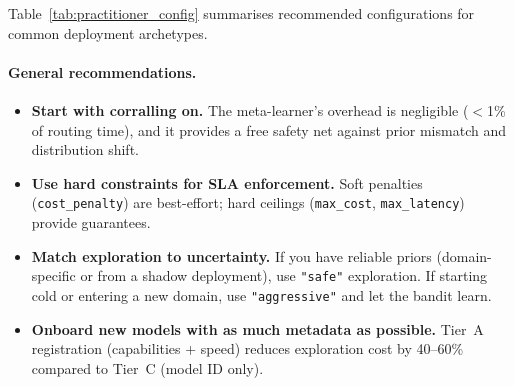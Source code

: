 Table~\ref{tab:practitioner_config} summarises recommended configurations for common deployment archetypes.

\begin{table}[htbp]
\centering
\caption{Recommended banditGPT configurations by deployment archetype.}
\label{tab:practitioner_config}
\small
{}
\end{table}

\paragraph{General recommendations.}

\begin{itemize}[nosep,leftmargin=*]
    \item \textbf{Start with corralling on.} The meta-learner's overhead is negligible ($<$1\% of routing time), and it provides a free safety net against prior mismatch and distribution shift.
    \item \textbf{Use hard constraints for SLA enforcement.} Soft penalties (\texttt{cost\_penalty}) are best-effort; hard ceilings (\texttt{max\_cost}, \texttt{max\_latency}) provide guarantees.
    \item \textbf{Match exploration to uncertainty.} If you have reliable priors (domain-specific or from a shadow deployment), use \texttt{"safe"} exploration.  If starting cold or entering a new domain, use \texttt{"aggressive"} and let the bandit learn.
    \item \textbf{Onboard new models with as much metadata as possible.} Tier~A registration (capabilities + speed) reduces exploration cost by 40--60\% compared to Tier~C (model ID only).
\end{itemize}
